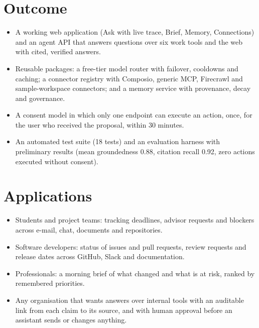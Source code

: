 \section{Outcome}
\begin{itemize}
\item A working web application (Ask with live trace, Brief, Memory, Connections) and an agent API that answers questions over six work tools and the web with cited, verified answers.
\item Reusable packages: a free-tier model router with failover, cooldowns and caching; a connector registry with Composio, generic MCP, Firecrawl and sample-workspace connectors; and a memory service with provenance, decay and governance.
\item A consent model in which only one endpoint can execute an action, once, for the user who received the proposal, within 30 minutes.
\item An automated test suite (18 tests) and an evaluation harness with preliminary results (mean groundedness 0.88, citation recall 0.92, zero actions executed without consent).
\end{itemize}

\section{Applications}
\begin{itemize}
\item Students and project teams: tracking deadlines, advisor requests and blockers across e-mail, chat, documents and repositories.
\item Software developers: status of issues and pull requests, review requests and release dates across GitHub, Slack and documentation.
\item Professionals: a morning brief of what changed and what is at risk, ranked by remembered priorities.
\item Any organisation that wants answers over internal tools with an auditable link from each claim to its source, and with human approval before an assistant sends or changes anything.
\end{itemize}

